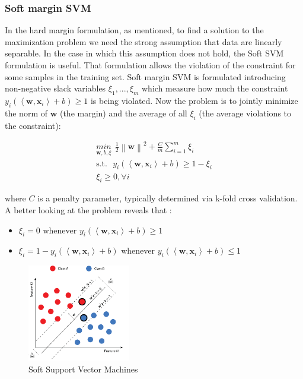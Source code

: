 \documentclass{article}
\begin{document}
\subsubsection{Soft margin SVM}

In the hard margin formulation, as mentioned, to find a solution to the maximization problem we need the strong assumption that data are linearly separable. In the case in which this assumption does not hold, the Soft SVM formulation is useful. That formulation allows the violation of the constraint for some samples in the training set. Soft margin SVM is formulated introducing non-negative slack variables $\xi_{1}, ..., \xi_{m}$ which measure how much the constraint $y_{i}(\left \langle \textbf{w},\textbf{x}_{i} \right \rangle + b) \geq 1$ is being violated. Now the problem is to jointly minimize the norm of $\textbf{w}$ (the margin) and the average of all $\xi_{i}$ (the average violations to the constraint):

\begin{equation}
\begin{aligned}
\underset{\textbf{w},b, \xi}{min} ~~ \frac{1}{2}\left \| \textbf{w} \right \|^{2} + \frac{C}{m} \sum_{i=1}^{m} \xi_{i} \\ \textrm{s.t.}~~~ y_{i}( \left \langle \textbf{w}, \textbf{x}_{i} \right \rangle + b)\geq 1 - \xi_{i} \\  \xi_{i}\geq0, \forall i
\end{aligned}
\end{equation}

where $C$ is a penalty parameter, typically determined via k-fold cross validation.
A better looking at the problem reveals that \cite{venti}:

\begin{itemize}
    \item $\xi_{i} = 0 $ whenever $y_{i}(\left \langle \textbf{w},\textbf{x}_{i} \right \rangle + b) \geq 1$
    \item $\xi_{i} = 1 - y_{i}(\left \langle \textbf{w},\textbf{x}_{i} \right \rangle + b)$ whenever $y_{i}(\left \langle \textbf{w},\textbf{x}_{i} \right \rangle + b) \leq 1$
\end{itemize}

\begin{figure}[h]
\centering
\includegraphics[width=0.4\textwidth]{softmargin.png}
\caption{Soft Support Vector Machines}
\end{figure}
\end{document}
